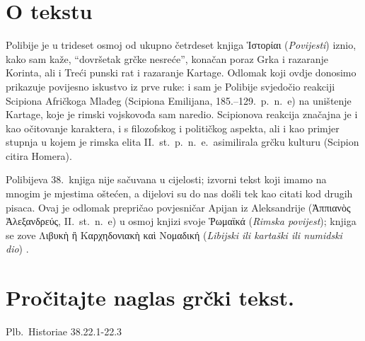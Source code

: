


\section*{O tekstu}

Polibije je u trideset osmoj od ukupno četrdeset knjiga \textgreek[variant=ancient]{Ἱστορίαι} (\textit{Povijesti}) iznio, kako sam kaže, ``dovršetak grčke nesreće'', konačan poraz Grka i razaranje Korinta, ali i Treći punski rat i razaranje Kartage. Odlomak koji ovdje donosimo prikazuje povijesno iskustvo iz prve ruke: i sam je Polibije svjedočio reakciji Scipiona Afričkoga Mlađeg (Scipiona Emilijana, 185.–129.\ p.~n.~e) na uništenje Kartage, koje je rimski vojskovođa sam naredio. Scipionova reakcija značajna je i kao očitovanje karaktera, i s filozofskog i političkog aspekta, ali i kao primjer stupnja u kojem je rimska elita II.~st.\ p.~n.~e.\ asimilirala grčku kulturu (Scipion citira Homera).

Polibijeva 38.\ knjiga nije sačuvana u cijelosti; izvorni tekst koji imamo na mnogim je mjestima oštećen, a dijelovi su do nas došli tek kao citati kod drugih pisaca. Ovaj je odlomak prepričao povjesničar Apijan iz Aleksandrije \textgreek[variant=ancient]{(Ἀππιανὸς Ἀλεξανδρεύς,} II.~st.\ n.~e) u osmoj knjizi svoje \textgreek[variant=ancient]{Ῥωμαϊκά} (\textit{Rimska povijest}); knjiga se zove \textgreek[variant=ancient]{Λιβυκὴ ἢ Καρχηδονιακὴ καὶ Νομαδική} (\textit{Libijski ili kartaški ili numidski dio}) .


\section*{Pročitajte naglas grčki tekst.}

Plb.\ Historiae 38.22.1-22.3


\medskip


